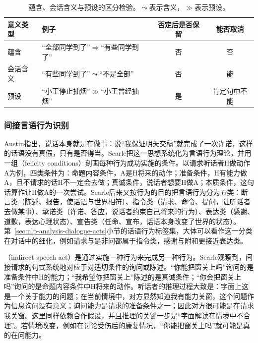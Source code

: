 \begin{table}[htbp]
  \centering
  \small
  \begin{tabularx}{\linewidth}{@{}l X cc@{}}
    \toprule
    意义类型 & 例子 & 否定后是否保留 & 能否取消\\
    \midrule
    蕴含 & “全部同学到了”$\Rightarrow$“有些同学到了” & 否 & 否\\
    会话含义 & “有些同学到了”$\leadsto$“不是全部” & 否 & 能\\
    预设 & “小王停止抽烟”$\gg$“小王曾经抽烟” & 是 & 肯定句中不能\\
    \bottomrule
  \end{tabularx}
  \caption{蕴含、会话含义与预设的区分检验。$\leadsto$表示含义，$\gg$表示预设。}
  \label{tab:nlp-analysis-meaning-types}
\end{table}

\subsubsection{间接言语行为识别}
\label{sec:nlp-analysis-indirect-acts}

Austin指出，说话本身就是在做事：说“我保证明天交稿”就完成了一次许诺，这样的话语没有真假，只有是否得当。Searle把这一思想系统化为言语行为理论，并用一组（felicity conditions）刻画每种行为成功实施的条件。以请求听话者H做动作A为例，四类条件为：命题内容条件，A是H将来的动作；准备条件，H有能力做A，且不请求的话H不一定会去做；真诚条件，说话者想要H做A；本质条件，这句话算作让H做A的一次尝试。Searle后来又按行为的目的把言语行为分为五类：断言类（陈述、报告，使话语与世界相符）、指令类（请求、命令、提问，让听话者去做某事）、承诺类（许诺、答应，说话者约束自己将来的行为）、表达类（感谢、道歉，表达心理状态）、宣告类（任命、宣布，话语本身改变了世界的状态）。第~\ref{sec:nlp-analysis-dialogue-acts}小节的话语行为标签集，大体可以看作这一分类在对话中的细化，例如请求与是非问都属于指令类，感谢与附和更接近表达类。

（indirect speech act）是通过实施一种行为来完成另一种行为。Searle观察到，间接请求的句式系统地对应于对适切条件的询问或陈述。“你能把窗关上吗”询问的是准备条件中H的能力；“我希望你把窗关上”陈述的是真诚条件；“你会把窗关上吗”询问的是命题内容条件中H将来的动作。听话者的推理过程大致是：字面上这是一个关于能力的问题；在当前情境中，对方显然知道我有能力关窗，这个问题作为信息询问没有意义；询问能力是请求的准备条件之一；因此对方很可能是在请求我关窗。这里同样依赖合作假设，并且推理的关键一步是“字面解读在情境中不合理”。若情境改变，例如在讨论受伤后的康复情况，“你能把窗关上吗”就可能是真的在问能力。

